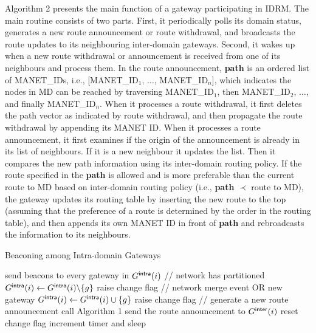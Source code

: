 Algorithm 2 presents the main function of a gateway participating in
IDRM. The main routine consists of two parts. First, it periodically
polls its domain status, generates a new route announcement or route
withdrawal, and broadcasts the route updates to its neighbouring
inter-domain gateways. Second, it wakes up when a new route withdrawal
or announcement is received from one of its neighbours and process
them. In the route announcement, {\bf path} is an ordered list of
MANET\_IDs, i.e., [MANET\_ID$_1$, $\ldots$, MANET\_ID$_n$], which
indicates the nodes in MD can be reached by traversing MANET\_ID$_1$,
then MANET\_ID$_2$, $\ldots$, and finally MANET\_ID$_n$.  When it
processes a route withdrawal, it first deletes the path vector as
indicated by route withdrawal, and then propagate the route withdrawal
by appending its MANET ID.  When it processes a route announcement, it
first examines if the origin of the announcement is already in its
list of neighbours. If it is a new neighbour it updates the list. Then
it compares the new path information using its inter-domain routing
policy. If the route specified in the {\bf path} is allowed and is
more preferable than the current route to MD based on inter-domain
routing policy (i.e., {\bf path} $\prec$ route to MD), the gateway
updates its routing table by inserting the new route to the top
(assuming that the preference of a route is determined by the order in
the routing table), and then appends its own MANET ID in front of {\bf
path} and rebroadcasts the information to its neighbours.



\begin{algorithm}[htb!] 
\caption{Beaconing among Intra-domain Gateways}
\label{alg2}
{\small
\begin{algorithmic}
\STATE send beacons to every gateway in $G^{\sf intra}(i)$
\ENDIF
\STATE // network has partitioned
\STATE $G^{\sf intra}(i) \leftarrow G^{\sf intra}(i) \backslash \{ g \}$
\STATE raise change flag
\ENDIF
\ENDFOR
{}
\STATE // network merge event OR new gateway
\STATE $G^{\sf intra}(i) \leftarrow G^{\sf intra}(i) \cup \{ g \}$
\STATE raise change flag
\ENDIF
{}
\STATE // generate a new route announcement 
\STATE call Algorithm 1
\STATE send the route announcement to $G^{\sf inter}(i)$
\STATE reset change flag 
\ENDIF
\STATE increment timer and sleep
\ENDWHILE
\end{algorithmic} 
} 
\end{algorithm} %




